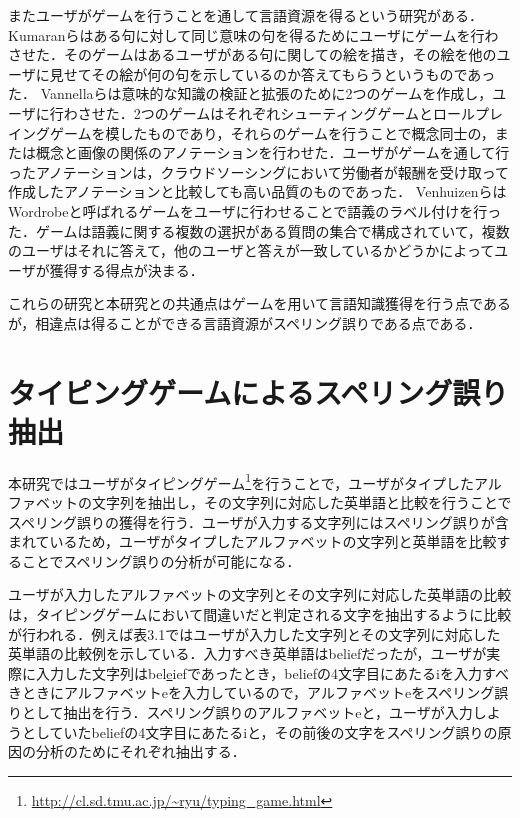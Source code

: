 \documentclass{jarticle}
\begin{document}
またユーザがゲームを行うことを通して言語資源を得るという研究がある．Kumaranらはある句に対して同じ意味の句を得るためにユーザにゲームを行わさせた\cite{kumaranCOLING2014}．そのゲームはあるユーザがある句に関しての絵を描き，その絵を他のユーザに見せてその絵が何の句を示しているのか答えてもらうというものであった．
Vannellaらは意味的な知識の検証と拡張のために2つのゲームを作成し，ユーザに行わさせた\cite{vannella2014validating}．2つのゲームはそれぞれシューティングゲームとロールプレイングゲームを模したものであり，それらのゲームを行うことで概念同士の，または概念と画像の関係のアノテーションを行わせた．ユーザがゲームを通して行ったアノテーションは，クラウドソーシングにおいて労働者が報酬を受け取って作成したアノテーションと比較しても高い品質のものであった．
VenhuizenらはWordrobeと呼ばれるゲームをユーザに行わせることで語義のラベル付けを行った\cite{venhuizen2013gamification}．ゲームは語義に関する複数の選択がある質問の集合で構成されていて，複数のユーザはそれに答えて，他のユーザと答えが一致しているかどうかによってユーザが獲得する得点が決まる．

これらの研究と本研究との共通点はゲームを用いて言語知識獲得を行う点であるが，相違点は得ることができる言語資源がスペリング誤りである点である．

\section{タイピングゲームによるスペリング誤り抽出}
本研究ではユーザがタイピングゲーム\footnote{\url{http://cl.sd.tmu.ac.jp/~ryu/typing_game.html}}を行うことで，ユーザがタイプしたアルファベットの文字列を抽出し，その文字列に対応した英単語と比較を行うことでスペリング誤りの獲得を行う．ユーザが入力する文字列にはスペリング誤りが含まれているため，ユーザがタイプしたアルファベットの文字列と英単語を比較することでスペリング誤りの分析が可能になる．

ユーザが入力したアルファベットの文字列とその文字列に対応した英単語の比較は，タイピングゲームにおいて間違いだと判定される文字を抽出するように比較が行われる．例えば表3.1ではユーザが入力した文字列とその文字列に対応した英単語の比較例を示している．入力すべき英単語はbeliefだったが，ユーザが実際に入力した文字列はbel\underline{e}iefであったとき，beliefの4文字目にあたるiを入力すべきときにアルファベットeを入力しているので，アルファベットeをスペリング誤りとして抽出を行う．スペリング誤りのアルファベットeと，ユーザが入力しようとしていたbeliefの4文字目にあたるiと，その前後の文字をスペリング誤りの原因の分析のためにそれぞれ抽出する．
\end{document}
